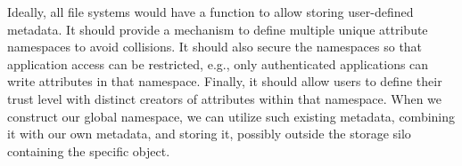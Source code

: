 
Ideally, all file systems would have a function to allow storing user-defined metadata.
It should provide a mechanism to define multiple unique attribute namespaces to avoid collisions.
It should also secure the namespaces so that application access can be restricted, e.g., only authenticated applications can write attributes in that namespace.
Finally, it should allow users to define their trust level with distinct creators of attributes within that namespace.
When we construct our global namespace, we can utilize such existing metadata, combining it with our own metadata, and storing it, possibly
outside the storage silo containing the specific object.


